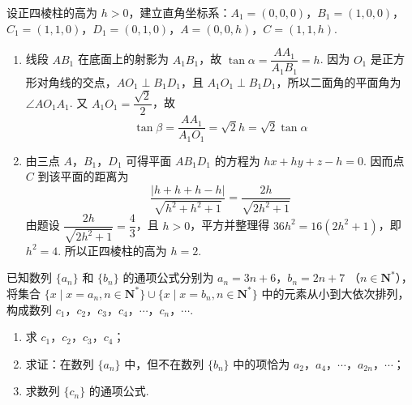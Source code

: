 \begin{solution}
设正四棱柱的高为 \(h>0\)，建立直角坐标系：\(A_1=(0,0,0)\)，\(B_1=(1,0,0)\)，\(C_1=(1,1,0)\)，\(D_1=(0,1,0)\)，\(A=(0,0,h)\)，\(C=(1,1,h)\).

\begin{enumerate}
\item 线段 \(AB_1\) 在底面上的射影为 \(A_1B_1\)，故 \(\tan\alpha=\dfrac{AA_1}{A_1B_1}=h\). 因为 \(O_1\) 是正方形对角线的交点，\(A O_1\perp B_1D_1\)，且 \(A_1O_1\perp B_1D_1\)，所以二面角的平面角为 \(\angle AO_1A_1\). 又 \(A_1O_1=\dfrac{\sqrt2}{2}\)，故
\[
\tan\beta=\frac{AA_1}{A_1O_1}=\sqrt2h=\sqrt2\tan\alpha
\]
\item 由三点 \(A\)，\(B_1\)，\(D_1\) 可得平面 \(AB_1D_1\) 的方程为 \(hx+hy+z-h=0\). 因而点 \(C\) 到该平面的距离为
\[
\frac{|h+h+h-h|}{\sqrt{h^2+h^2+1}}=\frac{2h}{\sqrt{2h^2+1}}
\]
由题设 \(\dfrac{2h}{\sqrt{2h^2+1}}=\dfrac43\)，且 \(h>0\)，平方并整理得 \(36h^2=16(2h^2+1)\)，即 \(h^2=4\). 所以正四棱柱的高为 \(h=2\).
\end{enumerate}
\end{solution}

\begin{problem}
已知数列 \(\{a_n\}\) 和 \(\{b_n\}\) 的通项公式分别为 \(a_n = 3n + 6\)，\(b_n = 2n + 7\) （\(n \in \mathbf{N}^{*}\)），将集合 \(\{x \mid x = a_n, n \in \mathbf{N}^{*}\} \cup \{x \mid x = b_n, n \in \mathbf{N}^{*}\}\) 中的元素从小到大依次排列，构成数列 \(c_1\)，\(c_2\)，\(c_3\)，\(c_4\)，\(\cdots\)，\(c_n\)，\(\cdots\).

\begin{enumerate}
\item 求 \(c_1\)，\(c_2\)，\(c_3\)，\(c_4\)；
\item 求证：在数列 \(\{a_n\}\) 中，但不在数列 \(\{b_n\}\) 中的项恰为 \(a_2\)，\(a_4\)，\(\cdots\)，\(a_{2n}\)，\(\cdots\)；
\item 求数列 \(\{c_n\}\) 的通项公式.
\end{enumerate}
\end{problem}

